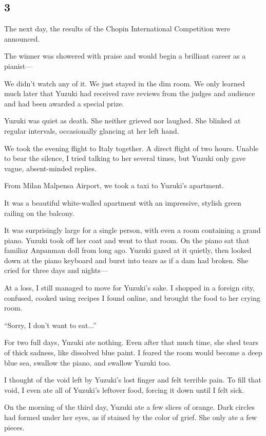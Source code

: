 \documentclass[
    a4paper,
    12pt,
    twoside,
    openany,
    UTF8,
    fontset=windows
]{ctexbook}
\begin{document}
\subsection*{3}

The next day, the results of the Chopin International Competition were announced.

The winner was showered with praise and would begin a brilliant career as a pianist---

We didn't watch any of it. We just stayed in the dim room. We only learned much later that Yuzuki had received rave reviews from the judges and audience and had been awarded a special prize.

Yuzuki was quiet as death. She neither grieved nor laughed. She blinked at regular intervals, occasionally glancing at her left hand.

We took the evening flight to Italy together. A direct flight of two hours. Unable to bear the silence, I tried talking to her several times, but Yuzuki only gave vague, absent-minded replies.

From Milan Malpensa Airport, we took a taxi to Yuzuki's apartment.

It was a beautiful white-walled apartment with an impressive, stylish green railing on the balcony.

It was surprisingly large for a single person, with even a room containing a grand piano. Yuzuki took off her coat and went to that room. On the piano sat that familiar Anpanman doll from long ago. Yuzuki gazed at it quietly, then looked down at the piano keyboard and burst into tears as if a dam had broken. She cried for three days and nights---

At a loss, I still managed to move for Yuzuki's sake. I shopped in a foreign city, confused, cooked using recipes I found online, and brought the food to her crying room.

``Sorry, I don't want to eat...''

For two full days, Yuzuki ate nothing. Even after that much time, she shed tears of thick sadness, like dissolved blue paint. I feared the room would become a deep blue sea, swallow the piano, and swallow Yuzuki too.

I thought of the void left by Yuzuki's lost finger and felt terrible pain. To fill that void, I even ate all of Yuzuki's leftover food, forcing it down until I felt sick.

On the morning of the third day, Yuzuki ate a few slices of orange. Dark circles had formed under her eyes, as if stained by the color of grief. She only ate a few pieces.
\end{document}
